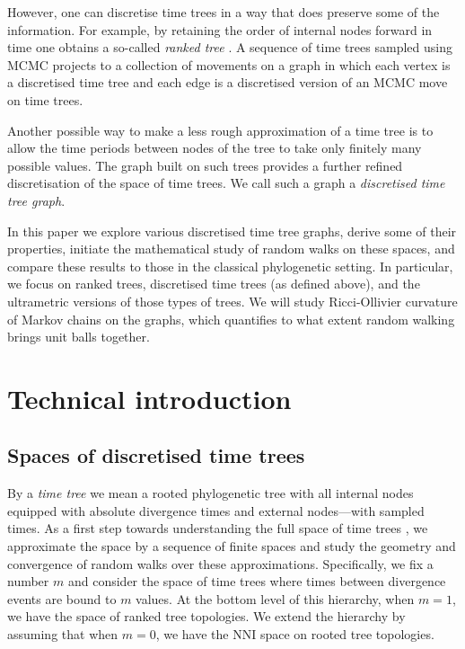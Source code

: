 \documentclass{amsart}
\newcommand{\nni}{\mathrm{NNI}}
\begin{document}
However, one can discretise time trees in a way that does preserve some of the information.
For example, by retaining the order of internal nodes forward in time one obtains a so-called \emph{ranked tree} \autocite{Semple2003-nj}.
A sequence of time trees sampled using MCMC projects to a collection of movements on a graph in which each vertex is a discretised time tree and each edge is a discretised version of an MCMC move on time trees.

Another possible way to make a less rough approximation of a time tree is to allow the time periods between nodes of the tree to take only finitely many possible values.
The graph built on such trees provides a further refined discretisation of the space of time trees.
We call such a graph a \emph{discretised time tree graph}.

In this paper we explore various discretised time tree graphs, derive some of their properties, initiate the mathematical study of random walks on these spaces, and compare these results to those in the classical phylogenetic setting.
In particular, we focus on ranked trees, discretised time trees (as defined above), and the ultrametric versions of those types of trees.
We will study Ricci-Ollivier curvature \autocite{Ollivier2009-cj} of Markov chains on the graphs, which quantifies to what extent random walking brings unit balls together.


\section{Technical introduction}
\subsection{Spaces of discretised time trees}

By a {\em time tree} we mean a rooted phylogenetic tree with all internal nodes equipped with absolute divergence times and external nodes---with sampled times.
As a first step towards understanding the full space of time trees \autocite{Gavryushkin2014-bw}, we approximate the space by a sequence of finite spaces and study the geometry and convergence of random walks over these approximations.
Specifically, we fix a number $m$ and consider the space of time trees where times between divergence events are bound to $m$ values.
At the bottom level of this hierarchy, when $m = 1$, we have the space of ranked tree topologies.
We extend the hierarchy by assuming that when $m = 0$, we have the $\nni$ space on rooted tree topologies.
\end{document}
